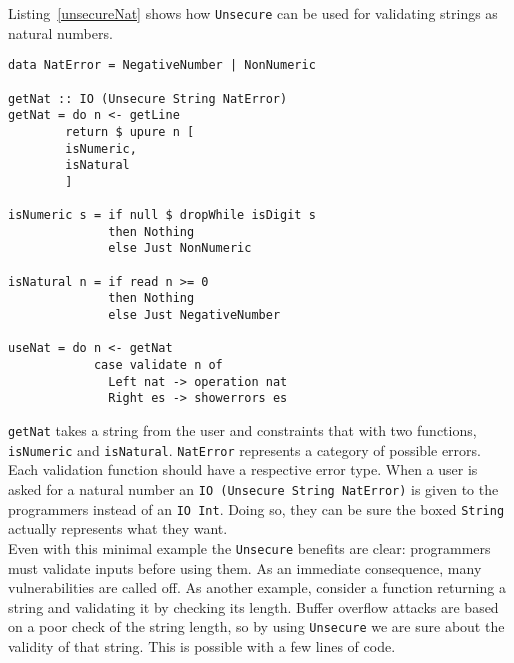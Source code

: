 Listing~\ref{unsecureNat} shows how \texttt{Unsecure} can be used for validating strings as natural numbers.
\begin{lstlisting}[label={unsecureNat}, breaklines=true, caption={Unsecure for natural numbers}]
data NatError = NegativeNumber | NonNumeric

getNat :: IO (Unsecure String NatError)
getNat = do n <- getLine
	    return $ upure n [
		isNumeric,
		isNatural
	    ]	   
	    
isNumeric s = if null $ dropWhile isDigit s
              then Nothing
              else Just NonNumeric

isNatural n = if read n >= 0
              then Nothing
              else Just NegativeNumber
              
useNat = do n <- getNat
            case validate n of
              Left nat -> operation nat
              Right es -> showerrors es
\end{lstlisting}
\texttt{getNat} takes a string from the user and constraints that with two functions, \texttt{isNumeric} and \texttt{isNatural}. \texttt{NatError} represents a category of possible errors. Each validation function should have a respective error type. When a user is asked for a natural number an \texttt{IO (Unsecure String NatError)} is given to the programmers instead of an \texttt{IO Int}. Doing so, they can be sure the boxed \texttt{String} actually represents what they want. \\
Even with this minimal example the \texttt{Unsecure} benefits are clear: programmers must validate inputs before using them. As an immediate consequence, many vulnerabilities are called off. As another example, consider a function returning a string and validating it by checking its length. Buffer overflow attacks are based on a poor check of the string length, so by using \texttt{Unsecure} we are sure about the validity of that string. This is possible with a few lines of code. 